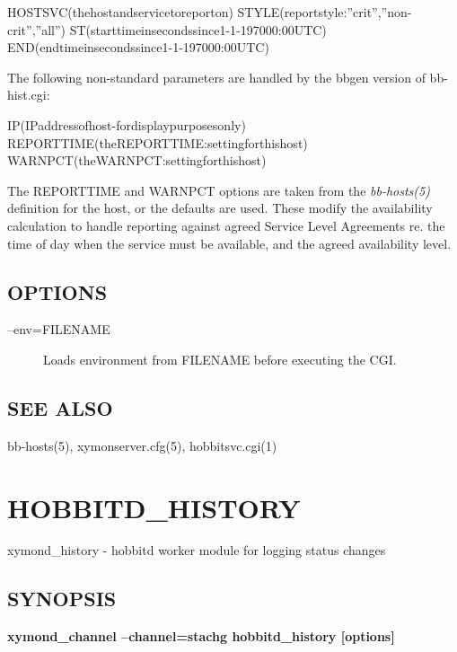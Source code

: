   
HOSTSVC(thehostandservicetoreporton)  
STYLE(reportstyle:''crit'',''non-crit'',''all'')  
ST(starttimeinsecondssince1-1-197000:00UTC)  
END(endtimeinsecondssince1-1-197000:00UTC) 


  The following non-standard parameters are handled by the bbgen version of bb-hist.cgi: 


  
IP(IPaddressofhost-fordisplaypurposesonly)  
REPORTTIME(theREPORTTIME:settingforthishost)  
WARNPCT(theWARNPCT:settingforthishost) 


  The REPORTTIME and WARNPCT options are taken from the
  \emph{bb-hosts(5)} definition for the host, or the defaults are
  used. These modify the availability calculation to handle reporting
  against agreed Service Level Agreements re. the time of day when the
  service must be available, and the agreed availability level. 



 
\subsection{OPTIONS}
\begin{description}
\item[--env=FILENAME] Loads environment from FILENAME before executing the CGI. 

 


\end{description}
\subsection{SEE ALSO}
bb-hosts(5), xymonserver.cfg(5), hobbitsvc.cgi(1) 

 
  
%
\newpage
\section{HOBBITD\_HISTORY}

 xymond\_history - hobbitd worker module for logging status changes

 \subsection{SYNOPSIS}
\textbf{xymond\_channel --channel=stachg hobbitd\_history [options]}


